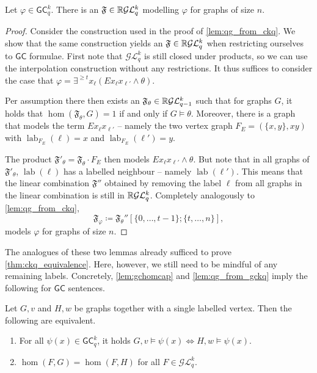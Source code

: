 \documentclass{lmcs}
\theoremstyle{plain}\newtheorem{claim}[thm]{Claim}   %
\newcommand{\RR}{\ensuremath \mathbb{R}}
\newcommand{\cG}{\ensuremath{\mathcal G}}
\newcommand{\cL}{\ensuremath{\mathcal L}}
\newcommand{\Lkq}{\ensuremath{\cL_{q}^{k}}}
\newcommand{\LParam}[2]{\ensuremath{\cL_{#2}^{#1}}}
\newcommand{\GEkq}{\ensuremath{\cG\Lkq}}
\newcommand{\GEParam}[2]{\ensuremath{\cG\LParam{#1}{#2}}}
\newcommand{\lGC}{\ensuremath{\mathsf{GC}}}
\newcommand{\qg}[1]{\ensuremath{\mathfrak{#1}}}
\newcommand{\qgp}[3]{\ensuremath{\mathfrak{#1}[#3; #2]}}
\DeclareMathOperator{\labfkt}{lab}
\begin{document}
\begin{lem}
	\label{lem:qg_from_gckq}
	Let $\varphi \in \lGC^k_q$.
	There is an $\qg{F} \in \RR\GEkq$ modelling $\varphi$ for graphs of size $n$.
\end{lem}

\begin{proof}
	Consider the construction used in the proof of \autoref{lem:qg_from_ckq}.
	We show that the same construction yields an $\qg{F} \in \RR\GEkq$ when restricting ourselves to $\lGC$ formulae.
	First note that $\GEkq$ is still closed under products, so we can use the interpolation construction without any restrictions.
	It thus suffices to consider the case that $\varphi = \exists^{{\geq} t} x_\ell (Ex_{\ell}x_{\ell'} \land \theta)$.
	
	Per assumption there then exists an $\qg{F_\theta} \in \RR\GEParam{k}{q-1}$ such that for graphs $G$, it holds that $\hom(\qg{F_\theta}, G) = 1$ if and only if $G \models \theta$.
	Moreover, there is a graph that models the term $Ex_{\ell}x_{\ell'}$ -- namely the two vertex graph $F_E = (\{x, y\}, {xy})$ with $\labfkt_{F_E}(\ell) = x$ and $\labfkt_{F_E}(\ell') = y$.
	
	The product $\qg{F'_\theta} = \qg{F}_\theta \cdot F_E$ then models $Ex_{\ell}x_{\ell'} \land \theta$.
	But note that in all graphs of $\qg{F'_\theta}$, $\labfkt(\ell)$ has a labelled neighbour -- namely $\labfkt(\ell')$.
	This means that the linear combination $\qg{F''}$ obtained by removing the label $\ell$ from all graphs in the linear combination is still in $\RR\GEkq$.
	Completely analogously to \autoref{lem:qg_from_ckq},
	\begin{equation*}
		\qg{F_\varphi} \coloneqq \qgp{F_\theta''}{\{t, \dots, n\}}{\{0, \dots, t-1\}},
	\end{equation*}
	models $\varphi$ for graphs of size $n$.
\end{proof}

The analogues of these two lemmas already sufficed to prove \autoref{thm:ckq_equivalence}.
Here, however, we still need to be mindful of any remaining labels.
Concretely, \autoref{lem:gchomcap} and \autoref{lem:qg_from_gckq} imply the following for $\lGC$ sentences.

\begin{cor}
	\label{cor:gc-thm-with-labels}
	Let $G, v$ and $H, w$ be graphs together with a single labelled vertex.
	Then the following are equivalent.
	\begin{enumerate}
		\item For all $\psi(x) \in \lGC^k_q$, it holds $G, v \models \psi(x) \iff H, w \models \psi(x)$.
		\item $\hom(F, G) = \hom(F, H)$ for all $F \in \GEkq$.
	\end{enumerate}
\end{cor}
\end{document}
